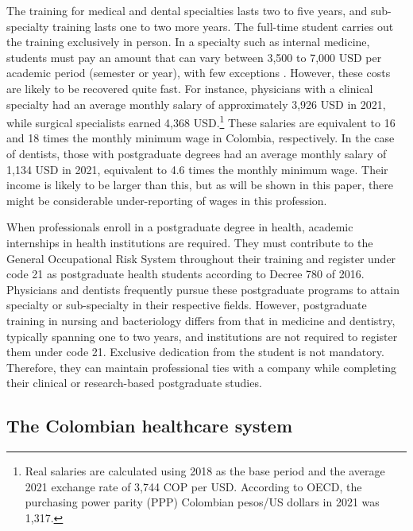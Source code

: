 \documentclass[12pt, a4paper]{article}
\begin{document}
The training for medical and dental specialties lasts two to five years, and sub-specialty training lasts one to two more years. The full-time student carries out the training exclusively in person. In a specialty such as internal medicine, students must pay an amount that can vary between 3,500 to 7,000 USD per academic period (semester or year), with few exceptions \citep{HernándezandSierra}. However, these costs are likely to be recovered quite fast. For instance, physicians with a clinical specialty had an average monthly salary of approximately 3,926 USD in 2021, while surgical specialists earned 4,368 USD.\footnote{Real salaries are calculated using 2018 as the base period and the average 2021 exchange rate of 3,744 COP per USD. According to OECD, the purchasing power parity (PPP) Colombian pesos/US dollars in 2021 was 1,317.} These salaries are equivalent to 16 and 18 times the monthly minimum wage in Colombia, respectively. In the case of dentists, those with postgraduate degrees had an average monthly salary of 1,134 USD in 2021, equivalent to 4.6 times the monthly minimum wage. Their income is likely to be larger than this, but as will be shown in this paper, there might be considerable under-reporting of wages in this profession.

When professionals enroll in a postgraduate degree in health, academic internships in health institutions are required. They must contribute to the General Occupational Risk System throughout their training and register under code 21 as postgraduate health students according to Decree 780 of 2016. Physicians and dentists frequently pursue these postgraduate programs to attain specialty or sub-specialty in their respective fields. However, postgraduate training in nursing and bacteriology differs from that in medicine and dentistry, typically spanning one to two years, and institutions are not required to register them under code 21. Exclusive dedication from the student is not mandatory. Therefore, they can maintain professional ties with a company while completing their clinical or research-based postgraduate studies.


\subsection{The Colombian healthcare system}
\end{document}
